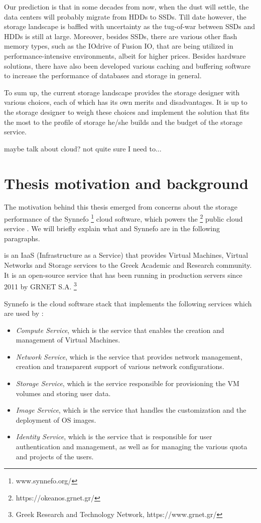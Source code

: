 Our prediction is that in some decades from now, when the dust will settle, the 
data centers will probably migrate from HDDs to SSDs. Till date however, the 
storage landscape is baffled with uncertainty as the tug-of-war between SSDs 
and HDDs is still at large. Moreover, besides SSDs, there are various other 
flash memory types, such as the IOdrive of Fusion IO, that are being utilized 
in performance-intensive environments, albeit for higher prices. Besides 
hardware solutions, there have also been developed various caching and 
buffering software to increase the performance of databases and storage in 
general. 

To sum up, the current storage landscape provides the storage designer with 
various choices, each of which has its own merits and disadvantages. It is up 
to the storage designer to weigh these choices and implement the solution that 
fits the most to the profile of storage he/she builds and the budget of the 
storage service.

\todo maybe talk about cloud? not quite sure I need to...

\section{Thesis motivation and background}

The motivation behind this thesis emerged from concerns about the storage 
performance of the Synnefo
\footnote{www.synnefo.org/} cloud software, which powers the \okeanos
\footnote{https://okeanos.grnet.gr/} public cloud service \cite{okeanos}. We 
will briefly explain what \okeanos and Synnefo are in the following paragraphs.

\okeanos is an IaaS (Infrastructure as a Service) that provides Virtual 
Machines, Virtual Networks and Storage services to the Greek Academic and 
Research community. It is an open-source service that has been running in 
production servers since 2011 by GRNET S.A.
\footnote{Greek Research and Technology Network, https://www.grnet.gr/}

Synnefo is the cloud software stack that implements the following services 
which are used by \okeanos:

\begin{itemize}
	\item \textit{Compute Service}, which is the service that enables the 
		creation and management of Virtual Machines.
	\item \textit{Network Service}, which is the service that provides network 
		management, creation and transparent support of various network 
		configurations.
	\item \textit{Storage Service}, which is the service responsible for 
		provisioning the VM volumes and storing user data.
	\item \textit{Image Service}, which is the service that handles the 
		customization and the deployment of OS images.
	\item \textit{Identity Service}, which is the service that is responsible 
		for user authentication and management, as well as for managing the 
		various quota and projects of the users.
\end{itemize}


